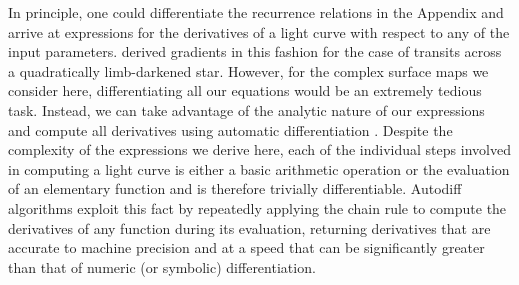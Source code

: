 \documentclass[modern]{aastex61}
\begin{document}
In principle, one could differentiate the recurrence relations in
the Appendix and arrive at expressions for the derivatives of a light curve with
respect to any of the input parameters. \citet{Pal2008} derived gradients in
this fashion for the case of transits across a quadratically limb-darkened star.
However, for the complex surface maps we consider here, differentiating all our
equations would be an extremely tedious
task. Instead, we can take advantage of the analytic nature of our expressions
and compute all derivatives using automatic differentiation \citep[autodiff; e.g.,][]{Wengert1964}.
Despite the complexity of the expressions we derive here, each of the individual
steps involved in computing a light curve is either a basic arithmetic operation
or the evaluation of an elementary function and is therefore trivially differentiable.
Autodiff algorithms exploit this fact by repeatedly applying the chain rule to
compute the derivatives of any function during its evaluation, returning derivatives
that are accurate to machine precision and at a speed that can be significantly greater
than that of numeric (or symbolic) differentiation.
\end{document}
